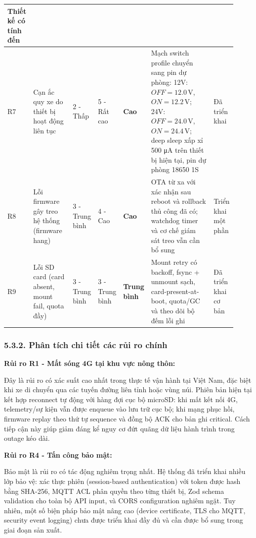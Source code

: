 \documentclass[a4paper]{extarticle}
\begin{document}
{\begin{longtable}{|L{0.055\linewidth}|L{0.180\linewidth}|L{0.090\linewidth}|L{0.090\linewidth}|L{0.120\linewidth}|L{0.300\linewidth}|L{0.090\linewidth}|}
Thiết kế có tính đến \\\hline
R7 & Cạn ắc quy xe do thiết bị hoạt động liên tục & 2 - Thấp & 5 - Rất
cao & \textbf{Cao} & Mạch switch profile chuyển sang pin dự phòng: 12V:
\(OFF = 12.0\,\mathrm{V}\), \(ON = 12.2\,\mathrm{V}\); 24V:
\(OFF = 24.0\,\mathrm{V}\), \(ON = 24.4\,\mathrm{V}\); deep sleep xấp xỉ 500
μA trên thiết bị hiện tại, pin dự phòng 18650 1S & Đã triển khai \\\hline
R8 & Lỗi firmware gây treo hệ thống (firmware hang) & 3 - Trung bình & 4
- Cao & \textbf{Cao} & OTA từ xa với xác nhận sau reboot và rollback thủ
công đã có; watchdog timer và cơ chế giám sát treo vẫn cần bổ sung &
Triển khai một phần \\\hline
R9 & Lỗi SD card (card absent, mount fail, quota đầy) & 3 - Trung bình &
3 - Trung bình & \textbf{Trung bình} & Mount retry có backoff, fsync +
unmount sạch, card-present-at-boot, quota/GC và theo dõi bộ đếm lỗi ghi
& Đã triển khai cơ bản \\\hline
\end{longtable}
}


\subsubsection{5.3.2. Phân tích chi tiết các rủi ro
chính}\label{532-phuxe2n-tuxedch-chi-tiux1ebft-cuxe1c-rux1ee7i-ro-chuxednh}

\textbf{Rủi ro R1 - Mất sóng 4G tại khu vực nông thôn:}

Đây là rủi ro có xác suất cao nhất trong thực tế vận hành tại Việt Nam,
đặc biệt khi xe di chuyển qua các tuyến đường liên tỉnh hoặc vùng núi.
Phiên bản hiện tại kết hợp reconnect tự động với hàng đợi cục bộ
microSD: khi mất kết nối 4G, telemetry/sự kiện vẫn được enqueue vào lưu
trữ cục bộ; khi mạng phục hồi, firmware replay theo thứ tự sequence và
đồng bộ ACK cho bản ghi critical. Cách tiếp cận này giúp giảm đáng kể
nguy cơ đứt quãng dữ liệu hành trình trong outage kéo dài.

\textbf{Rủi ro R4 - Tấn công bảo mật:}

Bảo mật là rủi ro có tác động nghiêm trọng nhất. Hệ thống đã triển khai
nhiều lớp bảo vệ: xác thực phiên (session-based authentication) với
token được hash bằng SHA-256, MQTT ACL phân quyền theo từng thiết bị,
Zod schema validation cho toàn bộ API input, và CORS configuration
nghiêm ngặt. Tuy nhiên, một số biện pháp bảo mật nâng cao (device
certificate, TLS cho MQTT, security event logging) chưa được triển khai
đầy đủ và cần được bổ sung trong giai đoạn sản xuất.
\end{document}

